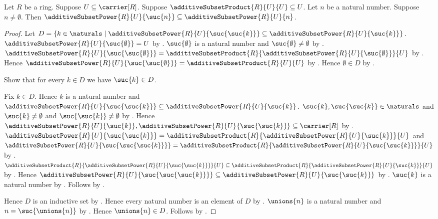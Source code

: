 \begin{theorem}\label{additive_subset_power_successor_subset}
    Let $R$ be a ring.
    Suppose $U\subseteq\carrier[R]$.
    Suppose $\additiveSubsetProduct{R}{U}{U}\subseteq U$.
    Let $n$ be a natural number.
    Suppose $n\neq\emptyset$.
    Then $\additiveSubsetPower{R}{U}{\suc{n}}
        \subseteq\additiveSubsetPower{R}{U}{n}$.
\end{theorem}
\begin{proof}
    Let $D=\{k\in\naturals\mid
        \additiveSubsetPower{R}{U}{\suc{\suc{k}}}
            \subseteq\additiveSubsetPower{R}{U}{\suc{k}}\}$.
    $\additiveSubsetPower{R}{U}{\suc{\emptyset}}=U$ by
        .
    $\suc{\emptyset}$ is a natural number and
        $\suc{\emptyset}\neq\emptyset$ by
        .
    $\additiveSubsetPower{R}{U}{\suc{\suc{\emptyset}}}
        =\additiveSubsetProduct{R}{
            \additiveSubsetPower{R}{U}{\suc{\emptyset}}}{U}$ by
        .
    Hence $\additiveSubsetPower{R}{U}{\suc{\suc{\emptyset}}}
        =\additiveSubsetProduct{R}{U}{U}$ by \auto.
    Hence $\emptyset\in D$ by .

    Show that for every $k\in D$ we have $\suc{k}\in D$.
    \begin{subproof}
        Fix $k\in D$.
        Hence $k$ is a natural number and
            $\additiveSubsetPower{R}{U}{\suc{\suc{k}}}
                \subseteq\additiveSubsetPower{R}{U}{\suc{k}}$.
        $\suc{k},\suc{\suc{k}}\in\naturals$ and
            $\suc{k}\neq\emptyset$ and
            $\suc{\suc{k}}\neq\emptyset$ by
            .
        Hence $\additiveSubsetPower{R}{U}{\suc{k}},
            \additiveSubsetPower{R}{U}{\suc{\suc{k}}}
            \subseteq\carrier[R]$ by
            .
        $\additiveSubsetPower{R}{U}{\suc{\suc{k}}}
            =\additiveSubsetProduct{R}{
                \additiveSubsetPower{R}{U}{\suc{k}}}{U}$ and
        $\additiveSubsetPower{R}{U}{\suc{\suc{\suc{k}}}}
            =\additiveSubsetProduct{R}{
                \additiveSubsetPower{R}{U}{\suc{\suc{k}}}}{U}$ by
            .
        $\additiveSubsetProduct{R}{
            \additiveSubsetPower{R}{U}{\suc{\suc{k}}}}{U}
            \subseteq\additiveSubsetProduct{R}{
                \additiveSubsetPower{R}{U}{\suc{k}}}{U}$ by
            .
        Hence $\additiveSubsetPower{R}{U}{\suc{\suc{\suc{k}}}}
            \subseteq\additiveSubsetPower{R}{U}{\suc{\suc{k}}}$ by
            \auto.
        $\suc{k}$ is a natural number by .
        Follows by \auto.
    \end{subproof}
    Hence $D$ is an inductive set by .
    Hence every natural number is an element of $D$ by
        .
    $\unions{n}$ is a natural number and $n=\suc{\unions{n}}$ by
        .
    Hence $\unions{n}\in D$.
    Follows by \auto.
\end{proof}

